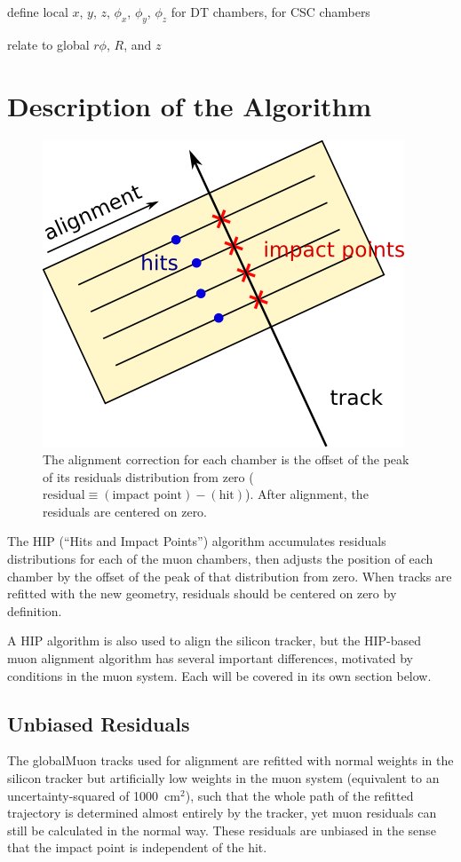 \documentclass[12pt]{article}
\begin{document}
define local $x$, $y$, $z$, $\phi_x$, $\phi_y$, $\phi_z$ for DT chambers, for CSC chambers

relate to global $r\phi$, $R$, and $z$

\section{Description of the Algorithm}

\begin{figure}
\begin{center} \includegraphics[width=0.35\linewidth]{hip_explanation.png} \end{center}
\caption{The alignment correction for each chamber is the offset of
  the peak of its residuals distribution from zero ($\mbox{residual}
  \equiv \left(\mbox{impact point}\right) - \left(\mbox{hit}\right)$).
  After alignment, the residuals are centered on
  zero. \label{fig:hip_explanation}}
\end{figure}

The HIP (``Hits and Impact Points'') algorithm accumulates residuals
distributions for each of the muon chambers, then adjusts the position
of each chamber by the offset of the peak of that distribution from
zero.  When tracks are refitted with the new geometry, residuals
should be centered on zero by definition.

A HIP algorithm is also used to align the silicon tracker, but the
HIP-based muon alignment algorithm has several important differences,
motivated by conditions in the muon system.  Each will be covered in
its own section below.

\subsection{Unbiased Residuals}
\label{sec:unbiased_residuals}

The globalMuon tracks used for alignment are refitted with normal
weights in the silicon tracker but artificially low weights in the
muon system (equivalent to an uncertainty-squared of 1000~cm$^2$),
such that the whole path of the refitted trajectory is determined
almost entirely by the tracker, yet muon residuals can still be
calculated in the normal way.  These residuals are unbiased in the
sense that the impact point is independent of the hit.
\end{document}

